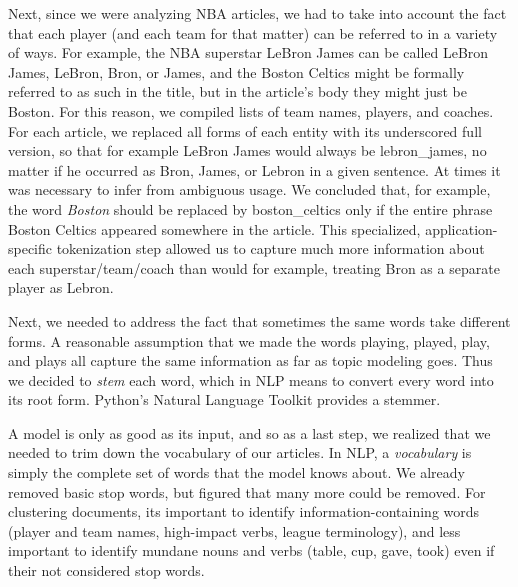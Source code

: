 \documentclass[11pt]{article}
\begin{document}
Next, since we were analyzing NBA articles, we had to take into account the fact that each player (and each team for that matter) can be referred to in a variety of ways. For example, the NBA superstar LeBron James can be called LeBron James, LeBron, Bron, or James, and the Boston Celtics might be formally referred to as such in the title, but in the article's body they might just be Boston. For this reason, we compiled lists of team names, players, and coaches.  For each article, we replaced all forms of each entity with its underscored full version, so that for example LeBron James would always be lebron\_james, no matter if he occurred as Bron, James, or Lebron in a given sentence.  At times it was necessary to infer from ambiguous usage. We concluded that, for example, the word \textit{Boston} should be replaced by boston\_celtics only if the entire phrase Boston Celtics appeared somewhere in the article.  This specialized, application-specific tokenization step allowed us to capture much more information about each superstar/team/coach than would for example, treating Bron as a separate player as Lebron.

Next, we needed to address the fact that sometimes the same words take different forms. A reasonable assumption that we made the words playing, played, play, and plays all capture the same information as far as topic modeling goes. Thus we decided to \textit{stem} each word, which in NLP means to convert every word into its root form.  Python's Natural Language Toolkit provides a stemmer.

A model is only as good as its input, and so as a last step, we realized that we needed to trim down the vocabulary of our articles. In NLP, a \textit{vocabulary} is simply the complete set of words that the model knows about.  We already removed basic stop words, but figured that many more could be removed. For clustering documents, its important to identify information-containing words (player and team names, high-impact verbs, league terminology), and less important to identify mundane nouns and verbs (table, cup, gave, took) even if their not considered stop words.
\end{document}
